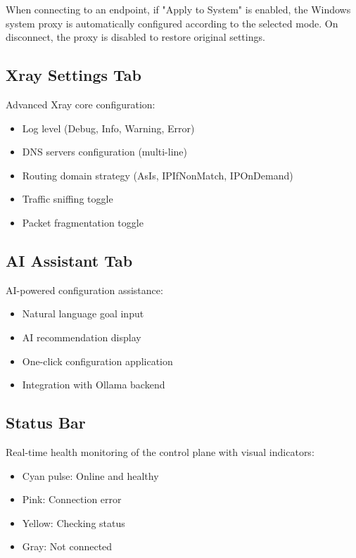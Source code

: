 When connecting to an endpoint, if "Apply to System" is enabled, the Windows system proxy is automatically configured according to the selected mode. On disconnect, the proxy is disabled to restore original settings.

\subsection{Xray Settings Tab}

Advanced Xray core configuration:
\begin{itemize}
    \item Log level (Debug, Info, Warning, Error)
    \item DNS servers configuration (multi-line)
    \item Routing domain strategy (AsIs, IPIfNonMatch, IPOnDemand)
    \item Traffic sniffing toggle
    \item Packet fragmentation toggle
\end{itemize}

\subsection{AI Assistant Tab}

AI-powered configuration assistance:
\begin{itemize}
    \item Natural language goal input
    \item AI recommendation display
    \item One-click configuration application
    \item Integration with Ollama backend
\end{itemize}

\subsection{Status Bar}

Real-time health monitoring of the control plane with visual indicators:
\begin{itemize}
    \item Cyan pulse: Online and healthy
    \item Pink: Connection error
    \item Yellow: Checking status
    \item Gray: Not connected
\end{itemize}

